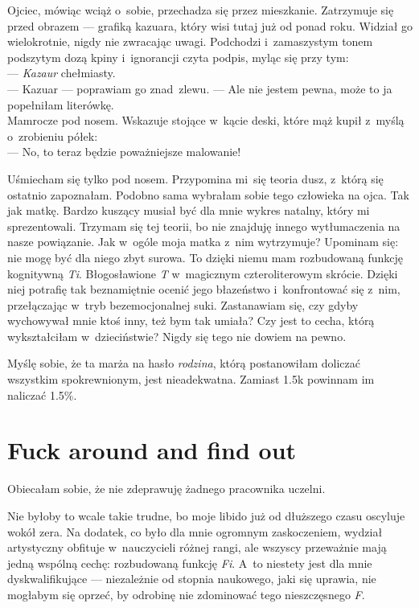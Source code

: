 \documentclass[9pt, a5paper]{memoir}
\begin{document}
Ojciec, mówiąc wciąż o~sobie, przechadza się przez mieszkanie. Zatrzymuje się przed obrazem --- grafiką kazuara, który wisi tutaj już od ponad roku. Widział go wielokrotnie, nigdy nie zwracając uwagi. Podchodzi i~zamaszystym tonem podszytym dozą kpiny i~ignorancji czyta podpis, myląc się przy tym:\\
--- \textit{Kazaur} chełmiasty.\\
--- Kazuar --- poprawiam go znad~zlewu. --- Ale nie jestem pewna, może to ja popełniłam literówkę.\\
Mamrocze pod nosem. Wskazuje stojące w~kącie deski, które mąż kupił z~myślą o~zrobieniu półek:\\
--- No, to teraz będzie poważniejsze malowanie!

Uśmiecham się tylko pod nosem. Przypomina mi~się teoria dusz, z~którą się ostatnio zapoznałam. Podobno sama wybrałam sobie tego człowieka na ojca. Tak jak matkę. Bardzo kuszący musiał być dla mnie wykres natalny, który mi sprezentowali. Trzymam się tej teorii, bo nie znajduję innego wytłumaczenia na nasze powiązanie. Jak w~ogóle moja matka z~nim wytrzymuje? Upominam się: nie mogę być dla niego zbyt surowa. To dzięki niemu mam rozbudowaną funkcję kognitywną \textit{Ti}. Błogosławione \textit{T} w~magicznym czteroliterowym skrócie. Dzięki niej potrafię tak beznamiętnie ocenić jego błazeństwo i~konfrontować się z~nim, przełączając w~tryb bezemocjonalnej suki. Zastanawiam się, czy gdyby wychowywał mnie ktoś inny, też bym tak umiała? Czy jest to cecha, którą wykształciłam w~dzieciństwie? Nigdy się tego nie dowiem na pewno.

Myślę sobie, że ta marża na hasło \textit{rodzina}, którą postanowiłam doliczać wszystkim spokrewnionym, jest nieadekwatna. Zamiast 1.5k powinnam im naliczać 1.5\%.

\newpage

\section{Fuck around and find out}
Obiecałam sobie, że nie zdeprawuję żadnego pracownika uczelni.

Nie byłoby to wcale takie trudne, bo moje libido już od dłuższego czasu oscyluje wokół zera. Na dodatek, co było dla mnie ogromnym zaskoczeniem, wydział artystyczny obfituje w~nauczycieli różnej rangi, ale wszyscy przeważnie mają jedną wspólną cechę: rozbudowaną funkcję \textit{Fi}. A~to niestety jest dla mnie dyskwalifikujące --- niezależnie od stopnia naukowego, jaki się uprawia, nie mogłabym się oprzeć, by odrobinę nie zdominować tego nieszczęsnego \textit{F}.
\end{document}
